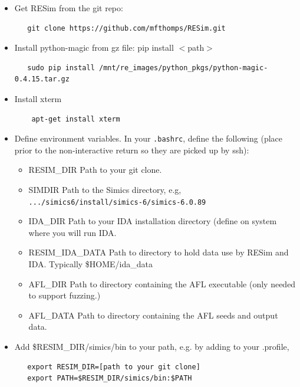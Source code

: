 \documentclass[titlepage]{article}
\begin{document}
\begin{itemize}
\item Get RESim from the git repo:
\begin{verbatim}
   git clone https://github.com/mfthomps/RESim.git
\end{verbatim}
\item Install python-magic from gz file:  pip install $<$path$>$
\begin{verbatim}
   sudo pip install /mnt/re_images/python_pkgs/python-magic-0.4.15.tar.gz
\end{verbatim}
\item Install xterm
\begin{verbatim}
    apt-get install xterm
\end{verbatim}
\item Define environment variables.  In your {\tt .bashrc}, define the following (place prior to the 
non-interactive return so they are picked up by ssh):
\begin{itemize}
\item RESIM\_DIR  Path to your git clone.
\item SIMDIR  Path to the Simics directory, e.g, {\tt .../simics6/install/simics-6/simics-6.0.89}
\item IDA\_DIR Path to your IDA installation directory (define on system where you will run IDA.
\item RESIM\_IDA\_DATA Path to directory to hold data use by RESim and IDA.  Typically \$HOME/ida\_data
\item AFL\_DIR Path to directory containing the AFL executable (only needed to support fuzzing.)
\item AFL\_DATA Path to directory containing the AFL seeds and output data.
\end{itemize}
\item Add \$RESIM\_DIR/simics/bin to your path, e.g. by adding to your .profile,
\begin{verbatim}
   export RESIM_DIR=[path to your git clone]
   export PATH=$RESIM_DIR/simics/bin:$PATH
\end{verbatim}

\end{itemize}
\end{document}
